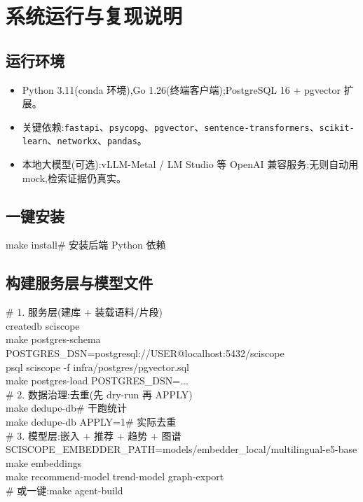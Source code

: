\section{系统运行与复现说明}

\subsection{运行环境}
\begin{itemize}
\item Python 3.11(conda 环境),Go 1.26(终端客户端);PostgreSQL 16 + pgvector 扩展。
\item 关键依赖:\texttt{fastapi}、\texttt{psycopg}、\texttt{pgvector}、\texttt{sentence-transformers}、\texttt{scikit-learn}、\texttt{networkx}、\texttt{pandas}。
\item 本地大模型(可选):vLLM-Metal / LM Studio 等 OpenAI 兼容服务;无则自动用 mock,检索证据仍真实。
\end{itemize}

\subsection{一键安装}
\begin{codepanel}\ttfamily\small
make install\hfill\# 安装后端 Python 依赖
\end{codepanel}

\subsection{构建服务层与模型文件}
\begin{codepanel}\ttfamily\small
\# 1. 服务层(建库 + 装载语料/片段)\\
createdb sciscope\\
make postgres-schema POSTGRES\_DSN=postgresql://USER@localhost:5432/sciscope\\
psql sciscope -f infra/postgres/pgvector.sql\\
make postgres-load POSTGRES\_DSN=...\\[3pt]
\# 2. 数据治理:去重(先 dry-run 再 APPLY)\\
make dedupe-db\hfill\# 干跑统计\\
make dedupe-db APPLY=1\hfill\# 实际去重\\[3pt]
\# 3. 模型层:嵌入 + 推荐 + 趋势 + 图谱\\
SCISCOPE\_EMBEDDER\_PATH=models/embedder\_local/multilingual-e5-base make embeddings\\
make recommend-model trend-model graph-export\\
\# 或一键:make agent-build
\end{codepanel}

